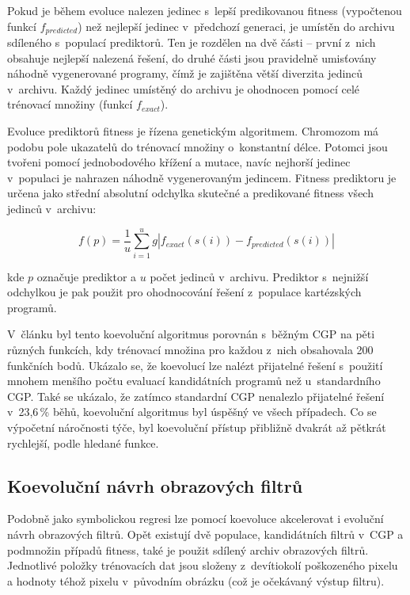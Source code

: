 Pokud je během evoluce nalezen jedinec s~lepší predikovanou fitness (vypočtenou funkcí $f_{\mathit{predicted}}$) než nejlepší jedinec v~předchozí generaci, je umístěn do archivu sdíleného s~populací prediktorů. Ten je rozdělen na dvě části -- první z~nich obsahuje nejlepší nalezená řešení, do druhé části jsou pravidelně umisťovány náhodně vygenerované programy, čímž je zajištěna větší diverzita jedinců v~archivu. Každý jedinec umístěný do archivu je ohodnocen pomocí celé trénovací množiny (funkcí $f_{\mathit{exact}}$).

Evoluce prediktorů fitness je řízena genetickým algoritmem. Chromozom má podobu pole ukazatelů do trénovací množiny o~konstantní délce. Potomci jsou tvořeni pomocí jednobodového křížení a mutace, navíc nejhorší jedinec v~populaci je nahrazen náhodně vygenerovaným jedincem. Fitness prediktoru je určena jako střední absolutní odchylka skutečné a predikované fitness všech jedinců v~archivu:

\begin{equation}
    \label{eqFpredictorSR}
    f \left( p \right) = \frac{1}{u} \sum\limits_{i=1}^{u} g \left| f_{\mathit{exact}} \left( s \left( i \right) \right) - f_{\mathit{predicted}} \left( s \left( i \right) \right) \right|
\end{equation}



\noindent{}kde $p$ označuje prediktor a $u$ počet jedinců v~archivu. Prediktor s~nejnižší odchylkou je pak použit pro ohodnocování řešení z~populace kartézských programů.

V~článku \cite{SikuEuroGP} byl tento koevoluční algoritmus porovnán s~běžným CGP na pěti různých funkcích, kdy trénovací množina pro každou z~nich obsahovala 200 funkčních bodů. Ukázalo se, že koevolucí lze nalézt přijatelné řešení s~použití mnohem menšího počtu evaluací kandidátních programů než u~standardního CGP. Také se ukázalo, že zatímco standardní CGP nenalezlo přijatelné řešení v~23,6\,\% běhů, koevoluční algoritmus byl úspěšný ve všech případech. Co se výpočetní náročnosti týče, byl koevoluční přístup přibližně dvakrát až pětkrát rychlejší, podle hledané funkce.


\subsection{Koevoluční návrh obrazových filtrů}

Podobně jako symbolickou regresi lze pomocí koevoluce akcelerovat i evoluční návrh obrazových filtrů. Opět existují dvě populace, kandidátních filtrů v~CGP a podmnožin případů fitness, také je použit sdílený archiv obrazových filtrů. Jednotlivé položky trénovacích dat jsou složeny z~devítiokolí poškozeného pixelu a hodnoty téhož pixelu v~původním obrázku (což je očekávaný výstup filtru).

